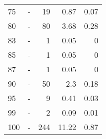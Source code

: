\begin{longtable}{lXrrr}
        75 & \multicolumn{1}{X}{-} & %
          \num{19} &
          \num[round-mode=places,round-precision=2]{0.87} &
          \num[round-mode=places,round-precision=2]{0.07} \\

        80 & \multicolumn{1}{X}{-} & %
          \num{80} &
          \num[round-mode=places,round-precision=2]{3.68} &
          \num[round-mode=places,round-precision=2]{0.28} \\

        83 & \multicolumn{1}{X}{-} & %
          \num{1} &
          \num[round-mode=places,round-precision=2]{0.05} &
          \num[round-mode=places,round-precision=2]{0} \\

        85 & \multicolumn{1}{X}{-} & %
          \num{1} &
          \num[round-mode=places,round-precision=2]{0.05} &
          \num[round-mode=places,round-precision=2]{0} \\

        87 & \multicolumn{1}{X}{-} & %
          \num{1} &
          \num[round-mode=places,round-precision=2]{0.05} &
          \num[round-mode=places,round-precision=2]{0} \\

        90 & \multicolumn{1}{X}{-} & %
          \num{50} &
          \num[round-mode=places,round-precision=2]{2.3} &
          \num[round-mode=places,round-precision=2]{0.18} \\

        95 & \multicolumn{1}{X}{-} & %
          \num{9} &
          \num[round-mode=places,round-precision=2]{0.41} &
          \num[round-mode=places,round-precision=2]{0.03} \\

        99 & \multicolumn{1}{X}{-} & %
          \num{2} &
          \num[round-mode=places,round-precision=2]{0.09} &
          \num[round-mode=places,round-precision=2]{0.01} \\

        100 & \multicolumn{1}{X}{-} & %
          \num{244} &
          \num[round-mode=places,round-precision=2]{11.22} &
          \num[round-mode=places,round-precision=2]{0.87} \\


\end{longtable}
